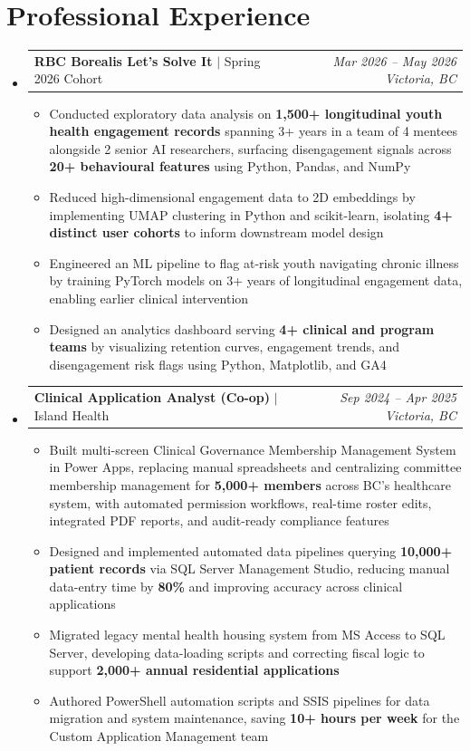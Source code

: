 \documentclass[10pt,letterpaper]{article}
\makeatletter
\newcommand{\resumeSubheading}[4]{
  \vspace{5pt}
  \item[]
    \begin{tabular*}{0.99\textwidth}[t]{l@{\extracolsep{\fill}}r}
      \textbf{\small #1} \textcolor{midgray}{$|$ \small #2} & \textcolor{midgray}{\textit{\small #3 \enspace #4}} \\
    \end{tabular*}
  \vspace{-2pt}
}
\newcommand{\resumeItem}[1]{
  \item {\small #1}
}
\makeatother
\begin{document}
\section{Professional Experience}
\begin{itemize}[leftmargin=0in, label={}]


  \resumeSubheading
    {RBC Borealis Let's Solve It}{Spring 2026 Cohort}
    {Mar 2026 -- May 2026}{Victoria, BC}
  \begin{itemize}
    \resumeItem{Conducted exploratory data analysis on \textbf{1,500+ longitudinal youth health engagement records} spanning 3+ years in a team of 4 mentees alongside 2 senior AI researchers, surfacing disengagement signals across \textbf{20+ behavioural features} using Python, Pandas, and NumPy}
    \resumeItem{Reduced high-dimensional engagement data to 2D embeddings by implementing UMAP clustering in Python and scikit-learn, isolating \textbf{4+ distinct user cohorts} to inform downstream model design}
    \resumeItem{Engineered an ML pipeline to flag at-risk youth navigating chronic illness by training PyTorch models on 3+ years of longitudinal engagement data, enabling earlier clinical intervention}
    \resumeItem{Designed an analytics dashboard serving \textbf{4+ clinical and program teams} by visualizing retention curves, engagement trends, and disengagement risk flags using Python, Matplotlib, and GA4}
  \end{itemize}
  \resumeSubheading
    {Clinical Application Analyst (Co-op)}{Island Health}
    {Sep 2024 -- Apr 2025}{Victoria, BC}
  \begin{itemize}
    \resumeItem{Built multi-screen Clinical Governance Membership Management System in Power Apps, replacing manual spreadsheets and centralizing committee membership management for \textbf{5,000+ members} across BC's healthcare system, with automated permission workflows, real-time roster edits, integrated PDF reports, and audit-ready compliance features}
    \resumeItem{Designed and implemented automated data pipelines querying \textbf{10,000+ patient records} via SQL Server Management Studio, reducing manual data-entry time by \textbf{80\%} and improving accuracy across clinical applications}
    \resumeItem{Migrated legacy mental health housing system from MS Access to SQL Server, developing data-loading scripts and correcting fiscal logic to support \textbf{2,000+ annual residential applications}}
    \resumeItem{Authored PowerShell automation scripts and SSIS pipelines for data migration and system maintenance, saving \textbf{10+ hours per week} for the Custom Application Management team}

\end{itemize}
\end{itemize}
\end{document}
